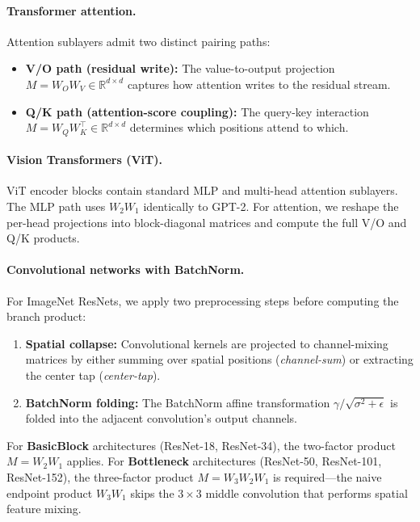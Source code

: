 \documentclass[wcp]{jmlr}
\begin{document}
\paragraph{Transformer attention.} Attention sublayers admit two distinct pairing paths:
\begin{itemize}[leftmargin=*,itemsep=2pt]
  \item \textbf{V/O path (residual write):} The value-to-output projection $M = W_O W_V \in \mathbb{R}^{d \times d}$ captures how attention writes to the residual stream.
  \item \textbf{Q/K path (attention-score coupling):} The query-key interaction $M = W_Q W_K^\top \in \mathbb{R}^{d \times d}$ determines which positions attend to which.
\end{itemize}

\paragraph{Vision Transformers (ViT).} ViT encoder blocks contain standard MLP and multi-head attention sublayers. The MLP path uses $W_2 W_1$ identically to GPT-2. For attention, we reshape the per-head projections into block-diagonal matrices and compute the full V/O and Q/K products.

\paragraph{Convolutional networks with BatchNorm.} For ImageNet ResNets, we apply two preprocessing steps before computing the branch product:
\begin{enumerate}[leftmargin=*,itemsep=2pt]
  \item \textbf{Spatial collapse:} Convolutional kernels are projected to channel-mixing matrices by either summing over spatial positions (\emph{channel-sum}) or extracting the center tap (\emph{center-tap}).
  \item \textbf{BatchNorm folding:} The BatchNorm affine transformation $\gamma / \sqrt{\sigma^2 + \epsilon}$ is folded into the adjacent convolution's output channels.
\end{enumerate}
For \textbf{BasicBlock} architectures (ResNet-18, ResNet-34), the two-factor product $M = W_2 W_1$ applies. For \textbf{Bottleneck} architectures (ResNet-50, ResNet-101, ResNet-152), the three-factor product $M = W_3 W_2 W_1$ is required---the naive endpoint product $W_3 W_1$ skips the $3 \times 3$ middle convolution that performs spatial feature mixing.
\end{document}
